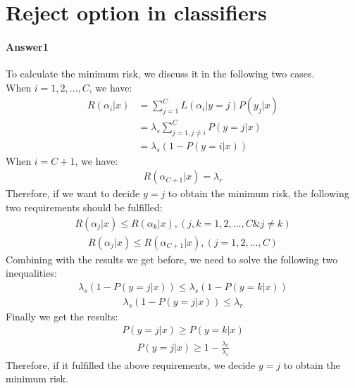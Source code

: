 \documentclass[paper=a4, fontsize=11pt]{scrartcl} %
\numberwithin{equation}{section} %
\numberwithin{figure}{section} %
\numberwithin{table}{section} %
\begin{document}
\section{Reject option in classifiers}

\paragraph{\textbf{Answer1}}
To calculate the minimum risk, we discuss it in the following two cases.
\\ When $i=1,2,...,C$, we have:
\begin{align*}
R\left ( \alpha _{i}|x \right )
&=\sum_{j=1}^{C}L\left ( \alpha _{i}|y=j \right )P\left ( y_{j}|x \right )
\\&=\lambda _{s}\sum_{j=1,j\neq i}^{C}P\left ( y=j|x \right )
\\&=\lambda _{s}\left ( 1-P\left ( y=i|x \right ) \right )
\end{align*}
When $i=C+1$, we have:
\begin{align*}
R\left ( \alpha _{C+1}|x \right )=\lambda _{r}
\end{align*}
Therefore, if we want to decide $y=j$ to obtain the minimum risk, the following two requirements should be fulfilled:
\begin{align*}
R\left ( \alpha _{j}|x \right )\leq R\left ( \alpha _{k}|x \right ),\left ( j,k=1,2,...,C \& j\neq k \right )
\end{align*}
\begin{align*}
R\left ( \alpha _{j}|x \right )\leq R\left ( \alpha _{C+1}|x \right ),\left ( j=1,2,...,C \right )
\end{align*}
Combining with the results we get before, we need to solve the following two inequalities:
\begin{align*}
\lambda _{s}\left ( 1-P\left ( y=j|x \right ) \right )\leq \lambda _{s}\left ( 1-P\left ( y=k|x \right ) \right )
\end{align*}
\begin{align*}
\lambda _{s}\left ( 1-P\left ( y=j|x \right ) \right )\leq \lambda _{r}
\end{align*}
Finally we get the results:
\begin{align*}
P\left ( y=j|x \right )\geq P\left ( y=k|x \right )
\end{align*}
\begin{align*}
P\left ( y=j|x \right )\geq 1-\frac{\lambda_{r} }{\lambda_{s} }
\end{align*}
Therefore, if it fulfilled the above requirements, we decide $y=j$ to obtain the minimum risk.
\end{document}
